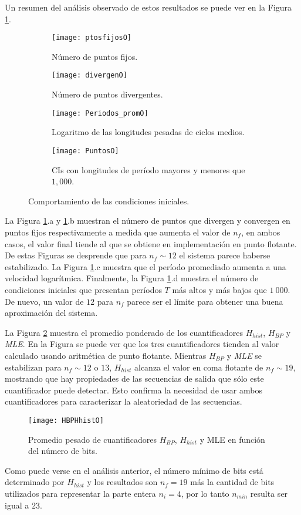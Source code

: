 Un resumen del análisis observado de estos resultados se puede ver en la Figura \ref{puntos}.
%
\begin{figure}
	\centering
	\begin{subfigure}[b]{0.49\textwidth}
		\texttt{[image: ptosfijosO]}
		\caption{Número de puntos fijos.}
	\end{subfigure}
	\hfill 
	\begin{subfigure}[b]{0.49\textwidth}
		\texttt{[image: divergenO]}
		\caption{Número de puntos divergentes.}
	\end{subfigure}
	\hfill 
	\begin{subfigure}[b]{0.49\textwidth}
		\texttt{[image: Periodos\_promO]}
		\caption{Logaritmo de las longitudes pesadas de ciclos medios.}
	\end{subfigure}
	\hfill   
	\begin{subfigure}[b]{0.49\textwidth}
		\texttt{[image: PuntosO]}
		\caption{CIs con longitudes de período mayores y menores que $1,000$.}
	\end{subfigure}
	\caption{Comportamiento de las condiciones iniciales.}\label{puntos}
\end{figure}
%
La Figura \ref{puntos}.a y \ref{puntos}.b muestran el número de puntos que divergen y convergen en puntos fijos respectivamente a medida que aumenta el valor de $n_f$, en ambos casos, el valor final tiende al que se obtiene en implementación en punto flotante.
De estas Figuras se desprende que para $n_f \sim 12$ el sistema parece haberse estabilizado.
La Figura \ref{puntos}.c muestra que el período promediado aumenta a una velocidad logarítmica.
Finalmente, la Figura \ref{puntos}.d muestra el número de condiciones iniciales que presentan períodos $T$ más altos y más bajos que $1~000$.
De nuevo, un valor de $12$ para $n_f$ parece ser el límite para obtener una buena aproximación del sistema.

La Figura \ref{fig:HBPHhist} muestra el promedio ponderado de los cuantificadores $H_{hist}$, $H_{BP}$ y \textsl{MLE}.
En la Figura se puede ver que los tres cuantificadores tienden al valor calculado usando aritmética de punto flotante.
Mientras $H_{BP}$ y \textsl{MLE} se estabilizan para $n_f \sim 12$ o $13$, $H_{hist}$ alcanza el valor en coma flotante de $n_f \sim 19$, mostrando que hay propiedades de las secuencias de salida que sólo este cuantificador puede detectar.
Esto confirma la necesidad de usar ambos cuantificadores para caracterizar la aleatoriedad de las secuencias.
%
\begin{figure}
	\centering
	\texttt{[image: HBPHhistO]}\\
	\caption{Promedio pesado de cuantificadores $H_{BP}$,  $H_{hist}$ y MLE en función del número de bits.}\label{fig:HBPHhist}
\end{figure}

Como puede verse en el análisis anterior, el número mínimo de bits está determinado por $H_{hist}$ y los resultados son $n_f = 19$ más la cantidad de bits utilizados para representar la parte entera $n_i = 4$, por lo tanto $n_{min}$ resulta ser igual a $23$.
